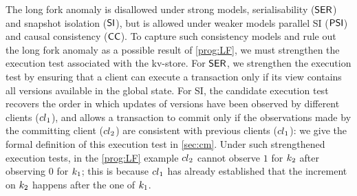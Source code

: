 The long fork anomaly is disallowed under strong models, \eg serialisability (\(\mathsf{SER}\)) and snapshot isolation (\(\mathsf{SI}\)), 
but is allowed under weaker models \eg parallel SI (\(\mathsf{PSI}\)) and causal consistency (\(\mathsf{CC}\)). 
To capture such consistency models and rule out the long fork anomaly as a possible result 
of \eqref{prog:LF}, we must strengthen the execution test associated with the kv-store. 
For \(\mathsf{SER}\), we strengthen the execution test by ensuring that a client can execute a transaction 
only if its view contains all versions available in the global state. 
For SI, the candidate execution test recovers the order in which 
updates of versions have been observed by different clients (\eg ${cl}_1$), 
and allows a transaction to commit only if the observations made by the committing client (\eg ${cl}_2$) are consistent with previous clients (\ie ${cl}_1$): we give the formal definition of this execution test  in \cref{sec:cm}.
Under such strengthened execution tests, in the \eqref{prog:LF} example ${cl}_2$ cannot
observe $1$ for $k_2$ after observing $0$ for $k_1$; 
this is because ${cl}_1$ has already established that the increment on $k_2$ happens after 
the one of $k_1$. 


